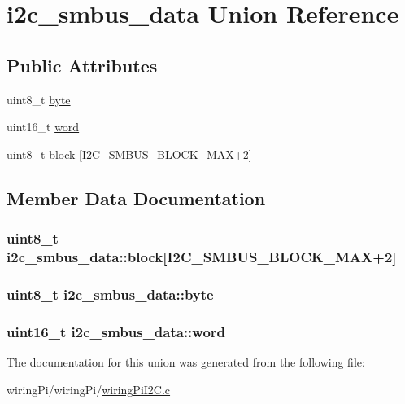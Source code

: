 \hypertarget{unioni2c__smbus__data}{\section{i2c\-\_\-smbus\-\_\-data Union Reference}
\label{unioni2c__smbus__data}
}
\subsection*{Public Attributes}
\begin{DoxyCompactItemize}
\item 
uint8\-\_\-t \hyperlink{unioni2c__smbus__data_a7145699abf962d118aa1c78ff864e892}{byte}
\item 
uint16\-\_\-t \hyperlink{unioni2c__smbus__data_ae8621bf131cbdfff90b21499a2c11a26}{word}
\item 
uint8\-\_\-t \hyperlink{unioni2c__smbus__data_a56729c242baa246a3105fd7c64b86f48}{block} \mbox{[}\hyperlink{wiringPiI2C_8c_ac2dd8b77e329bba4a3ca9cd275f9bf50}{I2\-C\-\_\-\-S\-M\-B\-U\-S\-\_\-\-B\-L\-O\-C\-K\-\_\-\-M\-A\-X}+2\mbox{]}
\end{DoxyCompactItemize}


\subsection{Member Data Documentation}
\hypertarget{unioni2c__smbus__data_a56729c242baa246a3105fd7c64b86f48}{
\subsubsection[{block}]{\setlength{\rightskip}{0pt plus 5cm}uint8\-\_\-t i2c\-\_\-smbus\-\_\-data\-::block\mbox{[}{\bf I2\-C\-\_\-\-S\-M\-B\-U\-S\-\_\-\-B\-L\-O\-C\-K\-\_\-\-M\-A\-X}+2\mbox{]}}}\label{unioni2c__smbus__data_a56729c242baa246a3105fd7c64b86f48}
\hypertarget{unioni2c__smbus__data_a7145699abf962d118aa1c78ff864e892}{
\subsubsection[{byte}]{\setlength{\rightskip}{0pt plus 5cm}uint8\-\_\-t i2c\-\_\-smbus\-\_\-data\-::byte}}\label{unioni2c__smbus__data_a7145699abf962d118aa1c78ff864e892}
\hypertarget{unioni2c__smbus__data_ae8621bf131cbdfff90b21499a2c11a26}{
\subsubsection[{word}]{\setlength{\rightskip}{0pt plus 5cm}uint16\-\_\-t i2c\-\_\-smbus\-\_\-data\-::word}}\label{unioni2c__smbus__data_ae8621bf131cbdfff90b21499a2c11a26}


The documentation for this union was generated from the following file\-:\begin{DoxyCompactItemize}
\item 
wiring\-Pi/wiring\-Pi/\hyperlink{wiringPiI2C_8c}{wiring\-Pi\-I2\-C.\-c}\end{DoxyCompactItemize}
